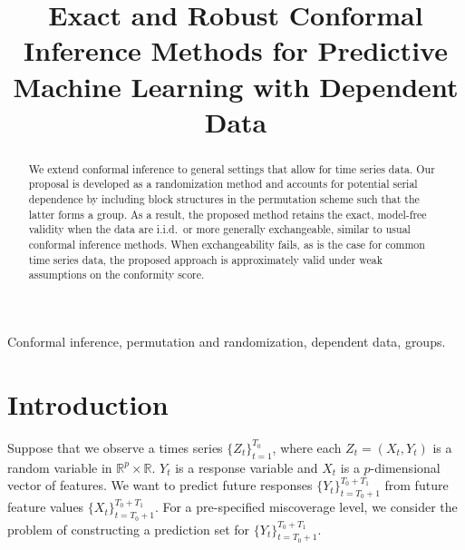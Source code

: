 \documentclass[final,12pt]{colt2018} %
\title[Conformal Inference for Dependent Data]{Exact and Robust Conformal Inference Methods
for Predictive Machine Learning with Dependent Data}
\begin{document}
\maketitle

\begin{abstract}

We extend conformal inference to general settings that allow for time series data. Our proposal is developed as a randomization method and  accounts for potential serial dependence by including  block structures in the permutation scheme such that the latter forms a group. As a result, the proposed method retains the exact, model-free validity when the data are i.i.d.\ or more generally exchangeable, similar to usual conformal inference methods.  When exchangeability fails, as is the case for common time series data, the proposed approach is approximately valid under weak assumptions on the conformity score. 




\end{abstract}

\begin{keywords}
Conformal inference, permutation and randomization, dependent data, groups.
\end{keywords}

\section{Introduction}

Suppose that we observe a times series $\{Z_t\}_{t=1}^{T_0}$, where each $Z_t=(X_t,Y_t)$ is a random variable in $\mathbb{R}^p\times \mathbb{R}$. $Y_t$ is a response variable and $X_t$ is a $p$-dimensional vector of features. We want to predict future responses $\{Y_t\}_{t=T_0+1}^{T_0+T_1}$ from future feature values $\{X_t\}_{t=T_0+1}^{T_0+T_1}$. For a pre-specified miscoverage level, we consider the problem of constructing a prediction set for  $\{Y_t\}_{t=T_0+1}^{T_0+T_1}$.
\end{document}
